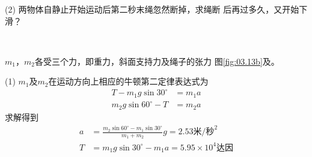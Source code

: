 (2) 两物体自静止开始运动后第二秒末绳忽然断掉，求绳断
后再过多久，又开始下滑？
\begin{figurex}
    \centering
    \\[-0.5em]
     \qquad
    \caption{}
    \label{fig:03.13}
\end{figurex}

\solution $m_1$，$m_2$各受三个力，即重力，斜面支持力及绳子的张力
\lhbrak 图\ref{fig:03.13b}及\rhbrak。

(1) $m_1$及$m_2$在运动方向上相应的牛顿第二定律表达式为
\begin{align*}
	T - m _ { 1 } g \sin 3 0 ^ { \circ } &= m _ { 1 } a \\[-0.5em]
	m _ { 2 } g \sin 6 0 ^ { \circ } - T &= m _ { 2 } a
\end{align*}
求解得到
\begin{align*}
	a &= \frac { m _ { 2 } \sin 6 0 ^ { \circ } - m _ { 1 } \sin 3 0 ^ { \circ } } { m _ { 1 } + m _ { 2 } } g = 2 . 5 3 \text{米/秒}^2 \\[-0.5em]
	T &= m _ { 1 } g \sin 3 0 ^ { \circ } - m _ { 1 } a = 5 . 9 5 \times 1 0 ^ { 4 } \text{达因}
\end{align*}

